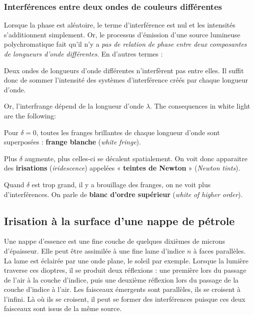 \subsubsection{Interférences entre deux ondes de couleurs différentes}

Lorsque la phase est aléatoire, le terme d'interférence est nul et les intensités
s'additionnent simplement. Or, le processus d'émission d'une source lumineuse
polychromatique fait qu'il n'y a \emph{pas de relation de phase entre deux
composantes de longueurs d'onde différentes}. En d'autres termes :

\begin{prop}
  Deux ondes de longueurs d'onde différentes n'interfèrent pas entre elles. Il
  suffit donc de sommer l'intensité des systèmes d'interférence créés par chaque
  longueur d'onde.
\end{prop}

Or, l'interfrange dépend de la longueur d'onde $\lambda$. The consequences in
white light are the following:

\begin{subpart}
  \item Pour $\delta = 0$, toutes les franges brillantes de chaque longueur d'onde
    sont superposées : \textbf{frange blanche} (\textit{white fringe}).
  \item Plus $\delta$ augmente, plus celles-ci se décalent spatialement. On voit
    donc apparaitre des \textbf{irisations} (\textit{iridescence}) appelées
    « \textbf{teintes de Newton} » (\textit{Newton tints}).
  \item Quand $\delta$ est trop grand, il y a brouillage des franges, on ne voit
    plus d'interférences. On parle de \textbf{blanc d'ordre supérieur}
    (\textit{white of higher order}).
\end{subpart}

\subsection{Irisation à la surface d'une nappe de pétrole}

Une nappe d'essence est une fine couche de quelques dixièmes de microns
d'épaisseur. Elle peut être assimilée à une fine lame d'indice $n$ à faces
parallèles. La lame est éclairée par une onde plane, le soleil par exemple.
Lorsque la lumière traverse ces dioptres, il se produit deux réflexions : une
première lors du passage de l'air à la couche d'indice, puis une deuxième
réflexion lors du passage de la couche d'indice à l'air. Les faisceaux émergents
sont parallèles, ils se croisent à l'infini. Là où ils se croisent, il peut se
former des interférences puisque ces deux faisceaux sont issus de la même source.

